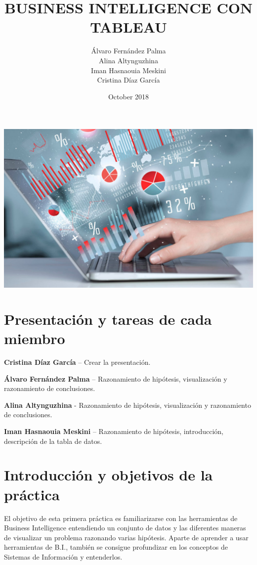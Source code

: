 \documentclass{article}
\title{BUSINESS INTELLIGENCE CON TABLEAU}
\author{Álvaro Fernández Palma\\ Alina Altynguzhina\\ Iman Hasnaouia Meskini\\ Cristina Díaz García}
\date{October 2018}
\begin{document}

\begin{titlingpage}
\maketitle

\begin{center}
\includegraphics[scale=0.3]{imagenes/BusinessIntelligence.jpg} 
\end{center}

\end{titlingpage}

\newpage

\tableofcontents

\newpage

\section{Presentación y tareas de cada miembro}

\textbf{Cristina Díaz García} – Crear la presentación. 

\textbf{Álvaro Fernández Palma} – Razonamiento de hipótesis, visualización y razonamiento de conclusiones. 

\textbf{Alina Altynguzhina} - Razonamiento de hipótesis, visualización y razonamiento de conclusiones. 

\textbf{Iman Hasnaouia Meskini} – Razonamiento de hipótesis, introducción, descripción de la tabla de datos. 

\section{Introducción y objetivos de la práctica}
El objetivo de esta primera práctica es familiarizarse con las herramientas de Business Intelligence entendiendo un conjunto de datos y las diferentes maneras de visualizar un problema razonando varias hipótesis. Aparte de aprender a usar herramientas de B.I., también se consigue profundizar en los conceptos de Sistemas de Información y entenderlos.
\end{document}

